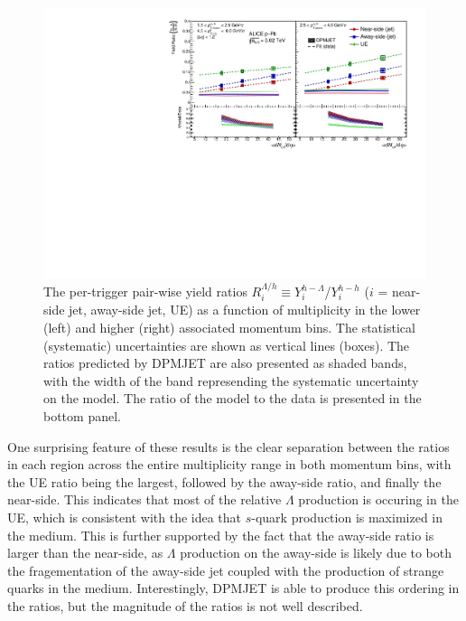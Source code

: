 \begin{figure}[h!]
\centering
\includegraphics[width=\textwidth]{figures/results/final_lambda_hadron_ratio_plot_new_x_axis_model_ratio.pdf}
\caption{The per-trigger pair-wise yield ratios $R_{i}^{\Lambda/h} \equiv Y_{i}^{h-\Lambda}$/$Y_{i}^{h-h}$ ($i$ = near-side jet, away-side jet, UE) as a function of multiplicity in the lower (left) and higher (right) associated momentum bins. The statistical (systematic) uncertainties are shown as vertical lines (boxes). The ratios predicted by DPMJET are also presented as shaded bands, with the width of the band represending the systematic uncertainty on the model. The ratio of the model to the data is presented in the bottom panel.}
\label{fig:lambda_hadron_ratio}
\end{figure}

One surprising feature of these results is the clear separation between the ratios in each region across the entire multiplicity range in both momentum bins, with the UE ratio being the largest, followed by the away-side ratio, and finally the near-side. This indicates that most of the relative $\Lambda$ production is occuring in the UE, which is consistent with the idea that $s$-quark production is maximized in the medium. This is further supported by the fact that the away-side ratio is larger than the near-side, as $\Lambda$ production on the away-side is likely due to both the fragementation of the away-side jet coupled with the production of strange quarks in the medium. Interestingly, DPMJET is able to produce this ordering in the ratios, but the magnitude of the ratios is not well described. 

